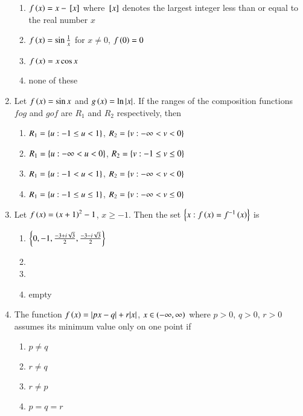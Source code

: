 \documentclass[journal,12pt,twocolumn]{IEEEtran}
\theoremstyle{remark}
\begin{document}
\begin{enumerate}
\hfill{}

\begin{enumerate}
\item $f\left(x\right)=x-{}\left[x\right]$ where ${}\left[x\right]$ denotes the largest integer less than or equal to the real number $x$
\item $f\left(x\right)=\sin{\frac{1}{x}}$ for $x\neq0$, $f\left(0\right)=0$
\item $f\left(x\right)=x\cos{x}$
\item none of these
\end{enumerate}

\item Let $f\left(x\right)=\sin{x}$ and $g\left(x\right)=\ln{|x|}$. If the ranges of the composition functions $fog$ and $gof$ are $R_1$ and $R_2$ respectively, then 

\hfill{}

\begin{enumerate}
\item $R_1=\left\{u:-1\le u<1\right\}$, $R_2=\left\{v:-\infty<v<0\right\}$
\item $R_1=\left\{u:-\infty<u<0\right\}$, $R_2=\left\{v:-1\le v\le0\right\}$
\item $R_1=\left\{u:-1<u<1\right\}$, $R_2=\left\{v:-\infty<v<0\right\}$
\item $R_1=\left\{u:-1\le u\le1\right\}$, $R_2=\left\{v:-\infty<v\le0\right\}$
\end{enumerate}

\item Let $f\left(x\right)=\left(x+1\right)^{2}-1$, $x\ge-1$. Then the set $\left\{x:f\left(x\right)=f^{-1}\left(x\right)\right\}$ is

\hfill{}

\begin{enumerate}
\item $\left\{0, -1, \frac{-3+i\sqrt{3}}{2}, \frac{-3-i\sqrt{3}}{2}\right\}$
\item {}
\item {}
\item empty
\end{enumerate}

\item The function $f\left(x\right)=|px-q|+r|x|$, $x\in\left(-\infty,\infty\right)$ where $p>0$, $q>0$, $r>0$ assumes its minimum value only on one point if

\hfill{}

\begin{multicols}{2}
	\begin{enumerate}
		\item $p\neq q$
		\item $r\neq q$
		\item $r\neq p$ 
		\item $p=q=r$
	\end{enumerate}
\end{multicols}


\end{enumerate}
\end{document}
